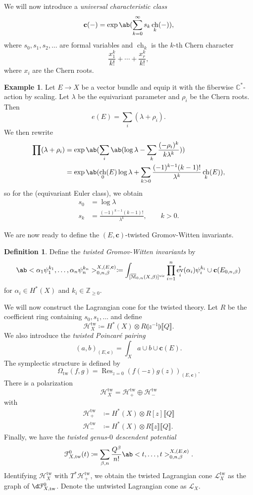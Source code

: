 \documentclass[leqno, openany]{memoir}
\theoremstyle{definition}
\newtheorem{defn}[thm]{Definition}
\newtheorem{exm}[thm]{Example}
\theoremstyle{remark}
\theoremstyle{plain}
\theoremstyle{definition}
\theoremstyle{remark}
\newcommand{\C}{\mathbb{C}}
\newcommand{\Z}{\mathbb{Z}}
\newcommand{\mc}[1]{\mathcal{#1}}
\newcommand{\mr}[1]{\mathrm{#1}}
\newcommand{\mbf}[1]{\mathbf{#1}}
\newcommand{\on}[1]{\operatorname{#1}}
\newcommand{\Mbar}{\overline{\mathcal{M}}}
\DeclareMathOperator{\ch}{ch}
\DeclareMathOperator{\ev}{ev}
\begin{document}
We will now introduce a \textit{universal characteristic class}
\[ \mbf{c}(-) = \exp \ab( \sum_{k=0}^{\infty} s_k \ch_k(-)), \]
where $s_0, s_1, s_2, \ldots$ are formal variables and $\ch_k$ is the $k$-th Chern character
\[ \frac{x_1^k}{k!} + \cdots + \frac{x_r^k}{k!}, \]
where $x_i$ are the Chern roots.

\begin{exm}
    Let $E \to X$ be a vector bundle and equip it with the fiberwise $\C^*$-action by scaling. Let $\lambda$ be the equivariant parameter and $\rho_i$ be the Chern roots. Then
    \[ e(E) = \sum_i (\lambda + \rho_i). \]
    We then rewrite
    \begin{align*}
        \prod( \lambda + \rho_i) &= \exp\ab(\sum_i \ab(\log \lambda - \sum_k \frac{(-\rho_i)^k}{k\lambda^k})) \\
        &= \exp\ab(\ch_0(E) \log \lambda + \sum_{k > 0} \frac{(-1)^{k-1}(k-1)!}{\lambda^k} \ch_k(E)),
    \end{align*}
    so for the (equivariant Euler class), we obtain
    \begin{align*}
        s_0 &= \log \lambda \\
        s_k &= \frac{(-1)^{k-1} (k-1)!}{\lambda^k}, \qquad k > 0.
    \end{align*}
\end{exm}

We are now ready to define the $(E,\mbf{c})$-twisted Gromov-Witten invariants.

\begin{defn}
    Define the \textit{twisted Gromov-Witten invariants} by
    \[ \ab<\alpha_1 \psi_1^{k_1}, \ldots, \alpha_n \psi_n^{k_n}>_{0,n,\beta}^{X,(E, \mbf{c})} \coloneqq \int_{[\Mbar_{0,n}(X,\beta)]^{\mr{vir}}} \prod_{i=1}^n \ev_i^*(\alpha_i)\psi_i^{k_i} \cup \mbf{c}(E_{0,n,\beta}) \]
    for $\alpha_i \in H^*(X)$ and $k_i \in \Z_{\geq 0}$.
\end{defn}

We will now construct the Lagrangian cone for the twisted theory. Let $R$ be the coefficient ring containing $s_0, s_1, \ldots$ and define
\[ \mc{H}^{\mr{tw}}_X \coloneqq H^*(X)\otimes R\llparenthesis z^{-1}\rrparenthesis \llbracket Q \rrbracket. \]
We also introduce the \textit{twisted Poincar\'e pairing}
\[ (a,b)_{(E, \mbf{c})} = \int_X a \cup b \cup \mbf{c}(E). \]
The symplectic structure is defined by
\[ \Omega_{\mr{tw}}(f,g) = \on{Res}_{z=0} (f(-z) g(z))_{(E,\mbf{c})}. \]
There is a polarization
\[ \mc{H}^{\mr{tw}}_X = \mc{H}_+^{\mr{tw}} \oplus \mc{H}_-^{\mr{tw}} \]
with
\begin{align*}
    \mc{H}_+^{\mr{tw}} &\coloneqq H^*(X) \otimes R[z]\llbracket Q \rrbracket \\
    \mc{H}_-^{\mr{tw}} &\coloneqq H^*(X) \otimes R\llbracket z\rrbracket\llbracket Q \rrbracket.
\end{align*}
Finally, we have the \textit{twisted genus-$0$ descendent potential}
\[ \mc{F}_{X,\mr{tw}}^0(t) \coloneqq \sum_{\beta, n} \frac{Q^{\beta}}{n!} \ab<t,\ldots,t>_{0,n,\beta}^{X,(E,\mbf{c})}. \]
Identifying $\mc{H}^{\mr{tw}}_X$ with $T^* \mc{H}_+^{\mr{tw}}$, we obtain the twisted Lagrangian cone $\mc{L}_X^{\mr{tw}}$ as the graph of $\d \mc{F}^0_{X,\mr{tw}}$. Denote the untwisted Lagrangian cone as $\mc{L}_X$.
\end{document}
